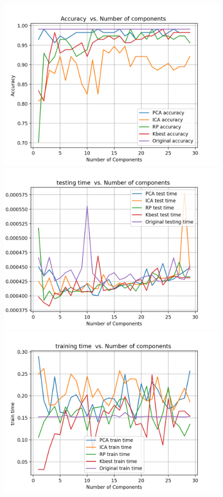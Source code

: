 \documentclass[a4paper,12pt]{article}
\begin{document}
\begin{figure}[!htb]
   \begin{minipage}{0.25\textwidth}
     \centering
     \includegraphics[width=.95\linewidth]{acc_neural_network_4}
   \end{minipage}\hfill
    \begin{minipage}{0.25\textwidth}
     \centering
     \includegraphics[width=.95\linewidth]{test_time_nn_4}
     \end{minipage}\hfill
     \begin{minipage}{0.25\textwidth}
     \centering
     \includegraphics[width=.95\linewidth]{train_time_nn_4}

\end{minipage}
\end{figure}
\end{document}
